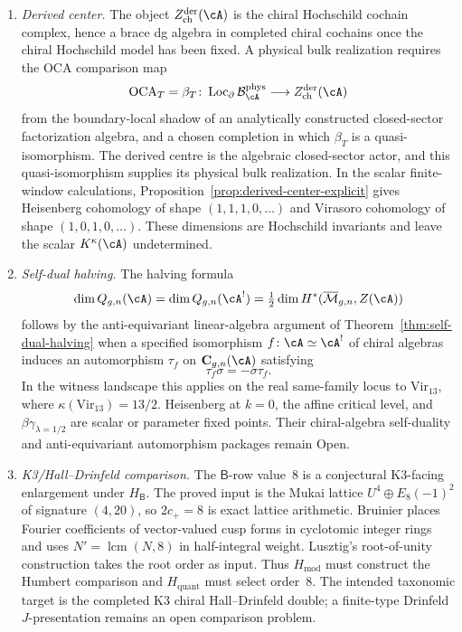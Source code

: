 \begin{proposition}
\begin{enumerate}[label=\textup{(\roman*)}]
\item \emph{Derived center.}
 The object
 $Z^{\mathrm{der}}_{\mathrm{ch}}(\cA)$ is the chiral Hochschild
 cochain complex, hence a brace dg algebra in completed chiral
 cochains once the chiral Hochschild model has been fixed. A physical
 bulk realization requires the OCA comparison map
 \[
  \mathrm{OCA}_T=\beta_T\colon
  \operatorname{Loc}_{\partial}\mathcal{B}^{\mathrm{phys}}_{\cA}
  \longrightarrow
  Z^{\mathrm{der}}_{\mathrm{ch}}(\cA)
 \]
 from the boundary-local shadow of an analytically constructed
 closed-sector factorization algebra, and a chosen completion in
 which \(\beta_T\) is a quasi-isomorphism.  The derived centre is the
 algebraic closed-sector actor, and this quasi-isomorphism supplies
 its physical bulk realization.
 In the scalar finite-window calculations,
 Proposition~\textup{\ref{prop:derived-center-explicit}} gives
 Heisenberg cohomology of shape $(1,1,1,0,\ldots)$ and Virasoro
 cohomology of shape $(1,0,1,0,\ldots)$. These dimensions are
 Hochschild invariants and leave the scalar
 $K^\kappa(\cA)$ undetermined.

\item \emph{Self-dual halving.}
 The halving formula
 \[
 \dim Q_{g,n}(\cA)=\dim Q_{g,n}(\cA^!)
=\tfrac12\dim H^*(\overline{\mathcal{M}}_{g,n},Z(\cA))
 \]
 follows by the anti-equivariant linear-algebra argument of
 Theorem~\textup{\ref{thm:self-dual-halving}} when a specified
 isomorphism $f\colon\cA\simeq\cA^!$ of chiral algebras induces an
 automorphism $\tau_f$ on $\mathbf{C}_{g,n}(\cA)$ satisfying
 \[
  \tau_f\sigma=-\sigma\tau_f .
 \]
 In the witness landscape this applies on the real same-family locus to
 $\mathrm{Vir}_{13}$, where
 $\kappa(\mathrm{Vir}_{13})=13/2$. Heisenberg at $k=0$, the affine
 critical level, and $\beta\gamma_{\lambda=1/2}$ are scalar or
 parameter fixed points.  Their chiral-algebra self-duality and
 anti-equivariant automorphism packages remain Open.

\item \emph{K3/Hall--Drinfeld comparison.}
 The $\mathsf B$-row value~$8$ is a conjectural K3-facing
 enlargement under $H_{\mathsf B}$.  The proved input is the Mukai
 lattice $U^4\oplus E_8(-1)^2$ of signature $(4,20)$, so
 $2c_+=8$ is exact lattice arithmetic.  Bruinier
 \cite[Lemma~5.1]{Bruinier2002} places Fourier coefficients of
 vector-valued cusp forms in cyclotomic integer rings and uses
 $N'=\operatorname{lcm}(N,8)$ in half-integral weight. Lusztig's
 root-of-unity construction takes the root order as input.  Thus
 $H_{\mathrm{mod}}$ must construct the Humbert comparison and
 $H_{\mathrm{quant}}$ must select order~$8$.  The intended taxonomic
 target is the completed K3 chiral Hall--Drinfeld double; a finite-type
 Drinfeld $J$-presentation remains an open comparison problem.
\end{enumerate}
\end{proposition}

